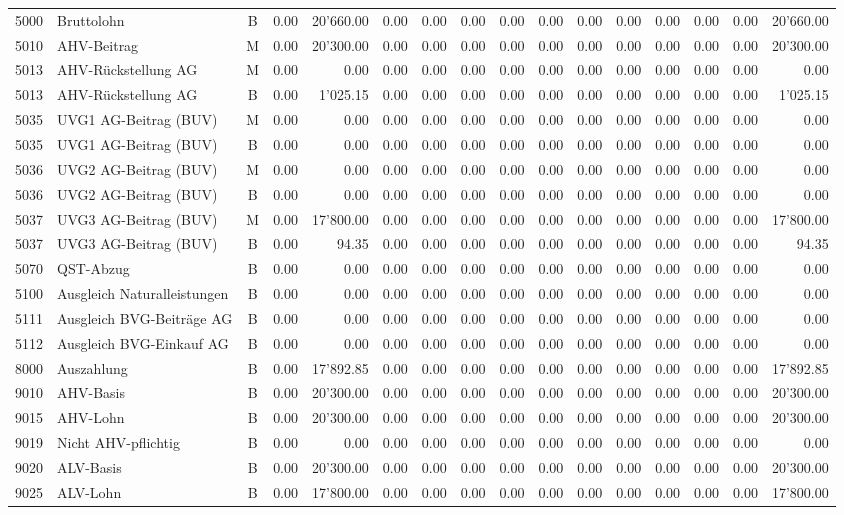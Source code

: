 \documentclass[8pt,a4paper]{extarticle}
\begin{document}
\begin{longtable}{@{\extracolsep{\fill}} l l c r r r r r r r r r r r r r}
5000&Bruttolohn&B&0.00&20'660.00&0.00&0.00&0.00&0.00&0.00&0.00&0.00&0.00&0.00&0.00&20'660.00\\
5010&AHV-Beitrag&M&0.00&20'300.00&0.00&0.00&0.00&0.00&0.00&0.00&0.00&0.00&0.00&0.00&20'300.00\\
5013&AHV-Rückstellung AG&M&0.00&0.00&0.00&0.00&0.00&0.00&0.00&0.00&0.00&0.00&0.00&0.00&0.00\\
5013&AHV-Rückstellung AG&B&0.00&1'025.15&0.00&0.00&0.00&0.00&0.00&0.00&0.00&0.00&0.00&0.00&1'025.15\\
5035&UVG1 AG-Beitrag (BUV)&M&0.00&0.00&0.00&0.00&0.00&0.00&0.00&0.00&0.00&0.00&0.00&0.00&0.00\\
5035&UVG1 AG-Beitrag (BUV)&B&0.00&0.00&0.00&0.00&0.00&0.00&0.00&0.00&0.00&0.00&0.00&0.00&0.00\\
5036&UVG2 AG-Beitrag (BUV)&M&0.00&0.00&0.00&0.00&0.00&0.00&0.00&0.00&0.00&0.00&0.00&0.00&0.00\\
5036&UVG2 AG-Beitrag (BUV)&B&0.00&0.00&0.00&0.00&0.00&0.00&0.00&0.00&0.00&0.00&0.00&0.00&0.00\\
5037&UVG3 AG-Beitrag (BUV)&M&0.00&17'800.00&0.00&0.00&0.00&0.00&0.00&0.00&0.00&0.00&0.00&0.00&17'800.00\\
5037&UVG3 AG-Beitrag (BUV)&B&0.00&94.35&0.00&0.00&0.00&0.00&0.00&0.00&0.00&0.00&0.00&0.00&94.35\\
5070&QST-Abzug&B&0.00&0.00&0.00&0.00&0.00&0.00&0.00&0.00&0.00&0.00&0.00&0.00&0.00\\
5100&Ausgleich Naturalleistungen&B&0.00&0.00&0.00&0.00&0.00&0.00&0.00&0.00&0.00&0.00&0.00&0.00&0.00\\
5111&Ausgleich BVG-Beiträge AG&B&0.00&0.00&0.00&0.00&0.00&0.00&0.00&0.00&0.00&0.00&0.00&0.00&0.00\\
5112&Ausgleich BVG-Einkauf AG&B&0.00&0.00&0.00&0.00&0.00&0.00&0.00&0.00&0.00&0.00&0.00&0.00&0.00\\
8000&Auszahlung&B&0.00&17'892.85&0.00&0.00&0.00&0.00&0.00&0.00&0.00&0.00&0.00&0.00&17'892.85\\
9010&AHV-Basis&B&0.00&20'300.00&0.00&0.00&0.00&0.00&0.00&0.00&0.00&0.00&0.00&0.00&20'300.00\\
9015&AHV-Lohn&B&0.00&20'300.00&0.00&0.00&0.00&0.00&0.00&0.00&0.00&0.00&0.00&0.00&20'300.00\\
9019&Nicht AHV-pflichtig&B&0.00&0.00&0.00&0.00&0.00&0.00&0.00&0.00&0.00&0.00&0.00&0.00&0.00\\
9020&ALV-Basis&B&0.00&20'300.00&0.00&0.00&0.00&0.00&0.00&0.00&0.00&0.00&0.00&0.00&20'300.00\\
9025&ALV-Lohn&B&0.00&17'800.00&0.00&0.00&0.00&0.00&0.00&0.00&0.00&0.00&0.00&0.00&17'800.00\\

\end{longtable}
\end{document}
